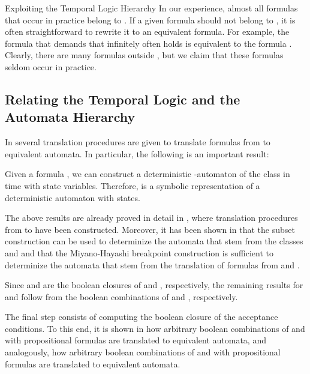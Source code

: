 \documentclass[copyright,creativecommons]{eptcs}
\begin{document}
\begin{section}{Exploiting the Temporal Logic Hierarchy}
In our experience, almost all formulas that occur in practice belong to . If a given formula should not belong to , it is often straightforward to rewrite it to an equivalent  formula. For example, the formula  that demands that infinitely often  holds is equivalent to the  formula . Clearly, there are many formulas outside , but we claim that these formulas seldom occur in practice.




\subsection{Relating the Temporal Logic and the Automata Hierarchy}

In \cite{Schn01b,Schn03} several translation procedures are given to translate formulas from  to equivalent  automata. In particular, the following is an important result:

\begin{theorem} \label{borel_thm}
Given a formula , we can construct a deterministic -automaton  of the class  in time  with  state variables. Therefore,  is a symbolic representation of a deterministic automaton with  states.
\end{theorem}

\noindent The above results are already proved in detail in \cite{Schn03}, where translation procedures from  to  have been constructed. Moreover, it has been shown in \cite{Schn03} that the subset construction can be used to determinize the automata that stem from the classes  and  and that the Miyano-Hayashi breakpoint construction is sufficient to determinize the automata that stem from the translation of formulas from  and .

Since  and  are the boolean closures of  and , respectively, the remaining results for  and  follow from the boolean combinations of  and , respectively.

The final step consists of computing the boolean closure of the acceptance conditions. To this end, it is shown in \cite{Schn03} how arbitrary boolean combinations of  and  with propositional formulas  are translated to equivalent  automata, and analogously, how arbitrary boolean combinations of  and  with propositional formulas  are translated to equivalent  automata.

\end{section}
\end{document}
